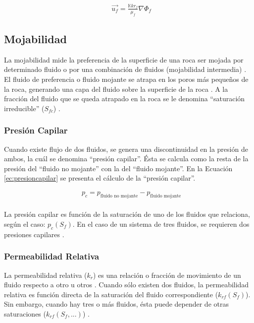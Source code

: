 \begin{align}
\label{ec:DarcyMultifasico} & \vec{u_{f}}=\frac{\mathbb{K}kr_{f}}{\mu_{f} } \nabla{\Phi_{f}}
\end{align}

\subsection{Mojabilidad}
La mojabilidad mide la preferencia de la superficie de una roca ser mojada por determinado fluido o por una combinación de fluidos (mojabilidad intermedia) \citep{chen2007reservoir}. El fluido de preferencia o fluido mojante se atrapa en los poros más pequeños de la roca, generando una capa del fluido sobre la superficie de la roca \citep{chen2007reservoir}. A la fracción del fluido que se queda atrapado en la roca se le denomina ``saturación irreducible'' ($S_{fc}$) \citep{chen2007reservoir}. \\

\subsubsection{Presión Capilar}
Cuando existe flujo de dos fluidos, se genera una discontinuidad en la presión de ambos, la cuál se denomina ``presión capilar''. Ésta se calcula como la resta de la presión del ``fluido no mojante'' con la del ``fluido mojante''\citep{chen2007reservoir, FANCHI2002108}. En la Ecuación \ref{ec:presioncapilar} se presenta el cálculo de la ``presión capilar''.

\begin{align}
	\label{ec:presioncapilar}&p_c = p_{\text{fluido no mojante}} - p_{\text{fluido mojante}}
\end{align}\\

La presión capilar es función de la saturación de uno de los fluidos que relaciona, según el caso: $p_c(S_{f})$. En el caso de un sistema de tres fluidos, se requieren dos presiones capilares \citep{chen2007reservoir}.

\subsubsection{Permeabilidad Relativa}
La permeabilidad relativa ($k_{r}$) es una relación o fracción de movimiento de un fluido respecto a otro u otros \citep{chen2007reservoir}. Cuando sólo existen dos fluidos, la permeabilidad relativa es función directa de la saturación del fluido correspondiente ($k_{rf}(S_{f})$). Sin embargo, cuando hay tres o más fluidos, ésta puede depender de otras saturaciones ($k_{rf}(S_{f}, ...)$) \citep{chen2007reservoir}.


